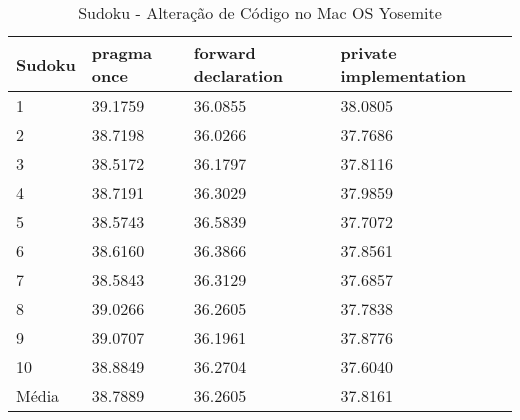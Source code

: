 \begin{table}[!h]
\centering
\caption{Sudoku - Alteração de Código no Mac OS Yosemite}
\label{tab:alteracao_de_codigo:mac:sudoku}
\begin{tabular}{llll}
\textbf{Sudoku} & \textbf{pragma once} & \textbf{forward declaration} & \textbf{private implementation}   \\ \toprule
1                                    & 39.1759  & 36.0855  & 38.0805  \\ 
2                                    & 38.7198  & 36.0266  & 37.7686  \\ 
3                                    & 38.5172  & 36.1797  & 37.8116  \\ 
4                                    & 38.7191  & 36.3029  & 37.9859  \\ 
5                                    & 38.5743  & 36.5839  & 37.7072  \\ 
6                                    & 38.6160  & 36.3866  & 37.8561  \\ 
7                                    & 38.5843  & 36.3129  & 37.6857  \\ 
8                                    & 39.0266  & 36.2605  & 37.7838  \\ 
9                                    & 39.0707  & 36.1961  & 37.8776  \\ 
10                                   & 38.8849  & 36.2704  & 37.6040  \\ \bottomrule
Média                                & 38.7889  & 36.2605  & 37.8161  \\ 
\end{tabular}
\end{table}


